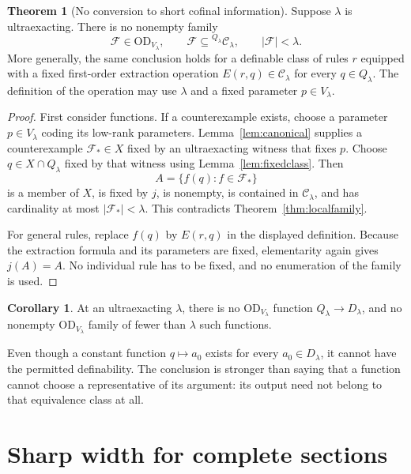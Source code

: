 \documentclass[11pt,letterpaper]{article}
\theoremstyle{definition}
\newtheorem{theorem}[definition]{Theorem}
\newtheorem{corollary}[definition]{Corollary}
\numberwithin{equation}{section}
\newcommand{\OD}{\mathrm{OD}}
\newcommand{\D}{D_\lambda}
\newcommand{\Q}{Q_\lambda}
\newcommand{\C}{\mathcal C_\lambda}
\newcommand{\FF}{\mathcal F}
\begin{document}
\begin{theorem}[No conversion to short cofinal information]\label{thm:conversion}
Suppose $\lambda$ is ultraexacting. There is no nonempty family
\[
 \FF\in\OD_{V_\lambda},\qquad
 \FF\subseteq{}^{\Q}\C,\qquad |\FF|<\lambda.
\]
More generally, the same conclusion holds for a definable class of rules $r$ equipped with a fixed first-order extraction operation $E(r,q)\in\C$ for every $q\in\Q$. The definition of the operation may use $\lambda$ and a fixed parameter $p\in V_\lambda$.
\end{theorem}
\begin{proof}
First consider functions. If a counterexample exists, choose a parameter $p\in V_\lambda$ coding its low-rank parameters. Lemma~\ref{lem:canonical} supplies a counterexample $\FF_*\in X$ fixed by an ultraexacting witness that fixes $p$. Choose $q\in X\cap\Q$ fixed by that witness using Lemma~\ref{lem:fixedclass}. Then
\[
 A=\{f(q):f\in\FF_*\}
\]
is a member of $X$, is fixed by $j$, is nonempty, is contained in $\C$, and has cardinality at most $|\FF_*|<\lambda$. This contradicts Theorem~\ref{thm:localfamily}.

For general rules, replace $f(q)$ by $E(r,q)$ in the displayed definition. Because the extraction formula and its parameters are fixed, elementarity again gives $j(A)=A$. No individual rule has to be fixed, and no enumeration of the family is used.
\end{proof}

\begin{corollary}\label{cor:Dconversion}
At an ultraexacting $\lambda$, there is no $\OD_{V_\lambda}$ function $\Q\to\D$, and no nonempty $\OD_{V_\lambda}$ family of fewer than $\lambda$ such functions.
\end{corollary}

Even though a constant function $q\mapsto a_0$ exists for every $a_0\in\D$, it cannot have the permitted definability. The conclusion is stronger than saying that a function cannot choose a representative of its argument: its output need not belong to that equivalence class at all.

\section{Sharp width for complete sections}\label{sec:width}
\end{document}
